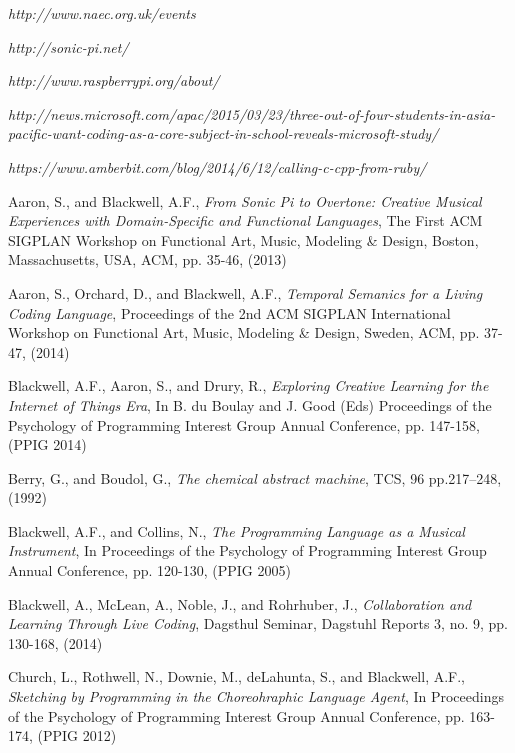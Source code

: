 \documentclass[11pt, abstracton, twoside]{scrartcl}
\begin{document}
\begin{thebibliography}{9}
\thispagestyle{empty}

  \emph{http://www.naec.org.uk/events}

  \emph{http://sonic-pi.net/}

  \emph{http://www.raspberrypi.org/about/}

  \emph{http://news.microsoft.com/apac/2015/03/23/three-out-of-four-students-in-asia-pacific-want-coding-as-a-core-subject-in-school-reveals-microsoft-study/}

  \emph{https://www.amberbit.com/blog/2014/6/12/calling-c-cpp-from-ruby/}

  Aaron, S., and Blackwell, A.F.,
  \emph{From Sonic Pi to Overtone: Creative Musical Experiences with Domain-Specific and Functional Languages},
  The First ACM SIGPLAN Workshop on Functional Art, Music, Modeling \& Design,
  Boston, Massachusetts, USA,
  ACM, pp. 35-46,
  (2013)

  Aaron, S., Orchard, D., and Blackwell, A.F.,
  \emph{Temporal Semanics for a Living Coding Language},
  Proceedings of the 2nd ACM SIGPLAN International Workshop on Functional Art, Music, Modeling \& Design,
  Sweden, ACM, pp. 37-47,
  (2014)

  Blackwell, A.F., Aaron, S., and Drury, R., 
  \emph{Exploring Creative Learning for the Internet of Things Era},
  In B. du Boulay and J. Good (Eds) Proceedings of the Psychology of Programming Interest Group Annual Conference, 
  pp. 147-158,
  (PPIG 2014)

  Berry, G., and Boudol, G.,
  \emph{The chemical abstract machine},
  TCS, 96 pp.217–248, 
  (1992)

  Blackwell, A.F., and Collins, N.,
  \emph{The Programming Language as a Musical Instrument},
  In Proceedings of the Psychology of Programming Interest Group Annual Conference,
  pp. 120-130,
  (PPIG 2005)

  Blackwell, A., McLean, A., Noble, J., and Rohrhuber, J.,
  \emph{Collaboration and Learning Through Live Coding},
  Dagsthul Seminar, Dagstuhl Reports 3,
  no. 9, pp. 130-168,
  (2014)

  Church, L., Rothwell, N., Downie, M., deLahunta, S., and Blackwell, A.F.,
  \emph{Sketching by Programming in the Choreohraphic Language Agent},
  In Proceedings of the Psychology of Programming Interest Group Annual Conference,
  pp. 163-174,
  (PPIG 2012)


\end{thebibliography}
\end{document}
